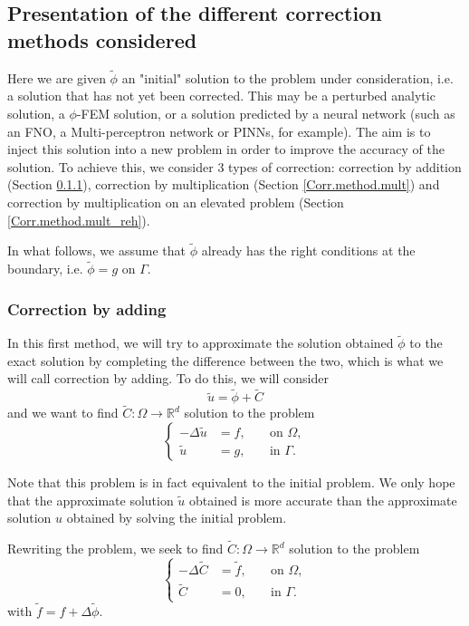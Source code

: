 \subsection{Presentation of the different correction methods considered} \label{Corr.methods}

Here we are given $\tilde{\phi}$ an "initial" solution to the problem under consideration, i.e. a solution that has not yet been corrected. This may be a perturbed analytic solution, a $\phi$-FEM solution, or a solution predicted by a neural network (such as an FNO, a Multi-perceptron network or PINNs, for example). The aim is to inject this solution into a new problem in order to improve the accuracy of the solution. To achieve this, we consider 3 types of correction: correction by addition (Section \ref{Corr.method.add}), correction by multiplication (Section \ref{Corr.method.mult}) and correction by multiplication on an elevated problem (Section \ref{Corr.method.mult_reh}).

\begin{Rem}
	In what follows, we assume that $\tilde{\phi}$ already has the right conditions at the boundary, i.e. $\tilde{\phi}=g$ on $\Gamma$.
\end{Rem}

\subsubsection{Correction by adding} \label{Corr.method.add}

In this first method, we will try to approximate the solution obtained $\tilde{\phi}$ to the exact solution by completing the difference between the two, which is what we will call correction by adding. To do this, we will consider
\begin{equation*}
	\tilde{u}=\tilde{\phi}+\tilde{C}
\end{equation*}
and we want to find $\tilde{C}: \Omega \rightarrow \mathbb{R}^d$ solution to the problem
\begin{equation*}
	\left\{\begin{aligned}
		-\Delta \tilde{u}&=f, \; &&\text{on } \Omega, \\
		\tilde{u}&=g, \; &&\text{in } \Gamma.
	\end{aligned}\right.
\end{equation*}
\begin{Rem}
	Note that this problem is in fact equivalent to the initial problem. We only hope that the approximate solution $\tilde{u}$ obtained is more accurate than the approximate solution $u$ obtained by solving the initial problem.
\end{Rem}
Rewriting the problem, we seek to find $\tilde{C}: \Omega \rightarrow \mathbb{R}^d$ solution to the problem
\begin{equation*}
\left\{\begin{aligned}
	-\Delta \tilde{C}&=\tilde{f}, \; &&\text{on } \Omega, \\
	\tilde{C}&=0, \; &&\text{in } \Gamma.
\end{aligned}\right. %
\end{equation*}
with $\tilde{f}=f+\Delta\tilde{\phi}$.

